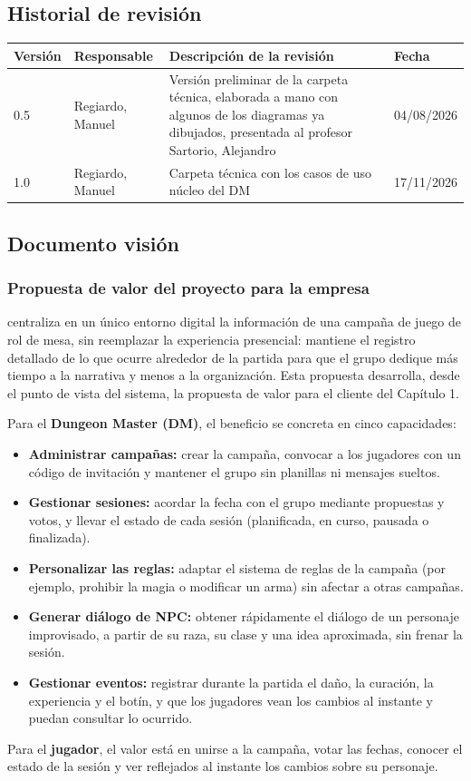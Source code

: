\subsection{Historial de revisión}
\begin{tabularx}{\textwidth}{|l|l|X|l|}
\hline
\textbf{Versión} & \textbf{Responsable} & \textbf{Descripción de la revisión} & \textbf{Fecha} \\ \hline
0.5 & Regiardo, Manuel & Versión preliminar de la carpeta técnica, elaborada a mano con algunos de los diagramas ya dibujados, presentada al profesor Sartorio, Alejandro & 04/08/2026 \\ \hline
1.0 & Regiardo, Manuel & Carpeta técnica con los casos de uso núcleo del DM & 17/11/2026 \\ \hline
\end{tabularx}

\subsection{Documento visión}
\subsubsection{Propuesta de valor del proyecto para la empresa}
\nombreproyecto{} centraliza en un único entorno digital la información de una campaña de juego de rol de mesa, sin reemplazar la experiencia presencial: mantiene el registro detallado de lo que ocurre alrededor de la partida para que el grupo dedique más tiempo a la narrativa y menos a la organización. Esta propuesta desarrolla, desde el punto de vista del sistema, la propuesta de valor para el cliente del Capítulo 1.

Para el \textbf{Dungeon Master (DM)}, el beneficio se concreta en cinco capacidades:
\begin{itemize}
  \item \textbf{Administrar campañas:} crear la campaña, convocar a los jugadores con un código de invitación y mantener el grupo sin planillas ni mensajes sueltos.
  \item \textbf{Gestionar sesiones:} acordar la fecha con el grupo mediante propuestas y votos, y llevar el estado de cada sesión (planificada, en curso, pausada o finalizada).
  \item \textbf{Personalizar las reglas:} adaptar el sistema de reglas de la campaña (por ejemplo, prohibir la magia o modificar un arma) sin afectar a otras campañas.
  \item \textbf{Generar diálogo de NPC:} obtener rápidamente el diálogo de un personaje improvisado, a partir de su raza, su clase y una idea aproximada, sin frenar la sesión.
  \item \textbf{Gestionar eventos:} registrar durante la partida el daño, la curación, la experiencia y el botín, y que los jugadores vean los cambios al instante y puedan consultar lo ocurrido.
\end{itemize}
Para el \textbf{jugador}, el valor está en unirse a la campaña, votar las fechas, conocer el estado de la sesión y ver reflejados al instante los cambios sobre su personaje.

